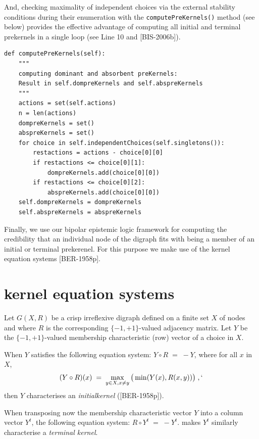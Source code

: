 And, checking maximality of independent choices via the external stability conditions during their enumeration with the \texttt{computePreKernels()} method (see below) provides the effective advantage of computing all initial and terminal prekernels in a single loop (see Line 10 and [BIS-2006b]).
\begin{lstlisting}[caption={Computing dominant and absorbent preKernels},label=list:17.1]
def computePreKernels(self):
    """
    computing dominant and absorbent preKernels:
    Result in self.dompreKernels and self.abspreKernels
    """
    actions = set(self.actions)
    n = len(actions)
    dompreKernels = set()
    abspreKernels = set()
    for choice in self.independentChoices(self.singletons()):
        restactions = actions - choice[0][0]
        if restactions <= choice[0][1]:
            dompreKernels.add(choice[0][0])
        if restactions <= choice[0][2]:
            abspreKernels.add(choice[0][0])
    self.dompreKernels = dompreKernels
    self.abspreKernels = abspreKernels
\end{lstlisting}
 
Finally, we use our bipolar epistemic logic framework for computing the credibility that an individual node of the digraph fits with being a member of an initial or terminal prekerenel. For this purpose we make use of the \Berge kernel equation systems [BER-1958p].

\section{\Berge kernel equation systems}
\label{sec:117:6}

Let $G(X,R)$ be a crisp irreflexive digraph defined on a finite set $X$ of nodes and where $R$ is the corresponding $\{-1,+1\}$-valued adjacency matrix. Let $Y$ be the $\{-1,+1\}$-valued membership characteristic (row) vector of a choice in $X$.

When $Y$ satisfies the following equation system: $Y \circ R \; = \; -Y$, where for all $x$ in $X$,
\begin{equation}\label{eq:17.2}
     (Y \circ R)(x) \; = \; \max_{y \in X, x \neq y} \big ( \min(Y(x), R(x,y))\big)\;,`
\end{equation}
then $Y$ characterises an \emph{initialkernel} ([BER-1958p]).

When transposing now the membership characteristic vector $Y$ into a column vector $Y^t$, the following equation system: $R \circ Y^t \; = \; -Y^t$.
makes $Y^t$ similarly characterise a \emph{terminal kernel}.

